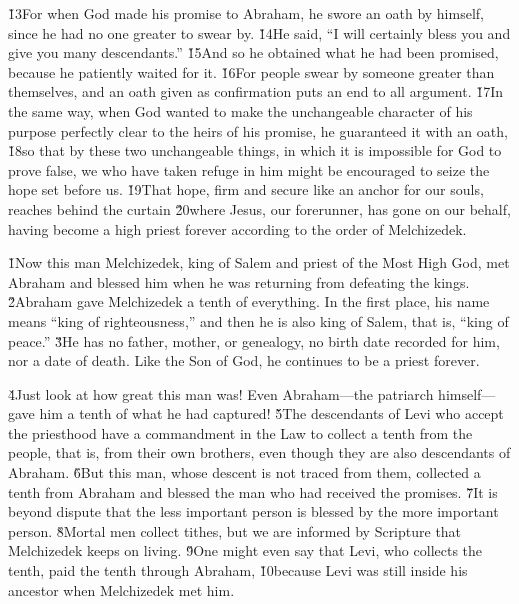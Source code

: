 \v{13}For when God made his promise to Abraham, he swore an oath by himself, since he had no one greater to swear by. \v{14}He said, ``I will certainly bless you and give you many descendants.'' \v{15}And so he obtained what he had been promised, because he patiently waited for it. \v{16}For people swear by someone greater than themselves, and an oath given as confirmation puts an end to all argument. \v{17}In the same way, when God wanted to make the unchangeable character of his purpose perfectly clear to the heirs of his promise, he guaranteed it with an oath, \v{18}so that by these two unchangeable things, in which it is impossible for God to prove false, we who have taken refuge in him might be encouraged to seize the hope set before us. \v{19}That hope, firm and secure like an anchor for our souls, reaches behind the curtain \v{20}where Jesus, our forerunner, has gone on our behalf, having become a high priest forever according to the order of Melchizedek.

\v{1}Now this man Melchizedek, king of Salem and priest of the Most High God, met Abraham and blessed him when he was returning from defeating the kings. \v{2}Abraham gave Melchizedek a tenth of everything. In the first place, his name means ``king of righteousness,'' and then he is also king of Salem, that is, ``king of peace.'' \v{3}He has no father, mother, or genealogy, no birth date recorded for him, nor a date of death. Like the Son of God, he continues to be a priest forever.

\v{4}Just look at how great this man was! Even Abraham---the patriarch himself---gave him a tenth of what he had captured! \v{5}The descendants of Levi who accept the priesthood have a commandment in the Law to collect a tenth from the people, that is, from their own brothers, even though they are also descendants of Abraham. \v{6}But this man, whose descent is not traced from them, collected a tenth from Abraham and blessed the man who had received the promises. \v{7}It is beyond dispute that the less important person is blessed by the more important person. \v{8}Mortal men collect tithes, but we are informed by Scripture that Melchizedek keeps on living. \v{9}One might even say that Levi, who collects the tenth, paid the tenth through Abraham, \v{10}because Levi was still inside his ancestor when Melchizedek met him.

